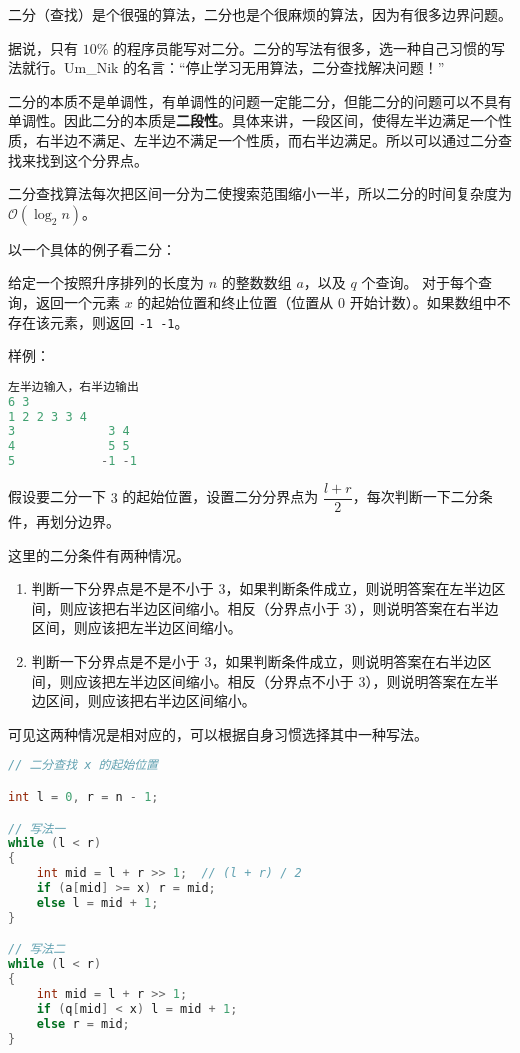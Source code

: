 
二分（查找）是个很强的算法，二分也是个很麻烦的算法，因为有很多边界问题。

据说，只有 $10 \%$ 的程序员能写对二分。二分的写法有很多，选一种自己习惯的写法就行。Um\_Nik 的名言：“停止学习无用算法，二分查找解决问题！”

二分的本质不是单调性，有单调性的问题一定能二分，但能二分的问题可以不具有单调性。因此二分的本质是\textbf{二段性}。具体来讲，一段区间，使得左半边满足一个性质，右半边不满足、左半边不满足一个性质，而右半边满足。所以可以通过二分查找来找到这个分界点。

二分查找算法每次把区间一分为二使搜索范围缩小一半，所以二分的时间复杂度为 $\mathcal{O}(\log_2 n)$。

以一个具体的例子看二分：

给定一个按照升序排列的长度为 $n$ 的整数数组 $a$，以及 $q$ 个查询。
对于每个查询，返回一个元素 $x$ 的起始位置和终止位置（位置从 $0$ 开始计数）。如果数组中不存在该元素，则返回 \verb|-1 -1|。

样例：
\begin{lstlisting}[language=cpp]
左半边输入，右半边输出
6 3
1 2 2 3 3 4
3             3 4
4             5 5
5            -1 -1
\end{lstlisting}

假设要二分一下 $3$ 的起始位置，设置二分分界点为 $\dfrac{l+r}{2}$，每次判断一下二分条件，再划分边界。

这里的二分条件有两种情况。

\begin{enumerate}
\item 判断一下分界点是不是不小于 $3$，如果判断条件成立，则说明答案在左半边区间，则应该把右半边区间缩小。相反（分界点小于 $3$），则说明答案在右半边区间，则应该把左半边区间缩小。
\item 判断一下分界点是不是小于 $3$，如果判断条件成立，则说明答案在右半边区间，则应该把左半边区间缩小。相反（分界点不小于 $3$），则说明答案在左半边区间，则应该把右半边区间缩小。
\end{enumerate}
可见这两种情况是相对应的，可以根据自身习惯选择其中一种写法。

\begin{lstlisting}[language=cpp]
// 二分查找 x 的起始位置

int l = 0, r = n - 1;

// 写法一
while (l < r)
{
	int mid = l + r >> 1;  // (l + r) / 2
    if (a[mid] >= x) r = mid;
    else l = mid + 1;
}

// 写法二
while (l < r)
{
    int mid = l + r >> 1;
    if (q[mid] < x) l = mid + 1;
    else r = mid;
}
\end{lstlisting}

